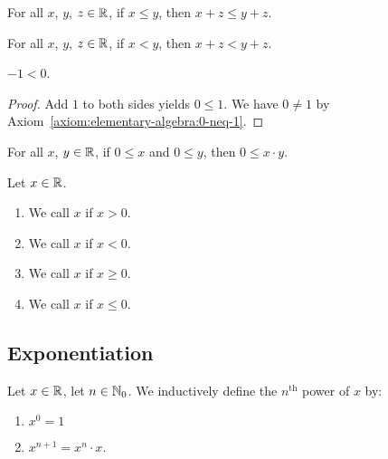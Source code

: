 \begin{axiom}\label{axiom:elementary-algebra:add-preserves-order}
For all $x$, $y$, $z\in\mathbb{R}$, if $x\leq y$, then $x + z\leq y + z$.
\end{axiom}

\begin{proposition}
For all $x$, $y$, $z\in\mathbb{R}$, if $x < y$, then $x + z < y + z$.
\end{proposition}

\begin{theorem}
$-1 < 0$.
\end{theorem}

\begin{proof}
Add $1$ to both sides yields $0\leq 1$. We have $0\neq1$ by Axiom~\ref{axiom:elementary-algebra:0-neq-1}.
\end{proof}

\begin{axiom}\label{axiom:elementary-algebra:times-preserves-order}
For all $x$, $y\in\mathbb{R}$, if $0\leq x$ and $0\leq y$, then $0 \leq x\cdot y$.
\end{axiom}

\begin{definition}
Let $x\in\mathbb{R}$.
\begin{enumerate}
\item We call $x$  if $x > 0$.
\item We call $x$  if $x < 0$.
\item We call $x$  if $x\geq 0$.
\item We call $x$  if $x\leq 0$.
\end{enumerate}
\end{definition}

\subsection{Exponentiation}

\begin{definition}
Let $x\in\mathbb{R}$, let $n\in\mathbb{N}_{0}$.
We inductively define the $n^{\text{th}}$ power of $x$ by:
\begin{enumerate}
\item $x^{0} = 1$
\item $x^{n + 1} = x^{n}\cdot x$.
\end{enumerate}
\end{definition}

